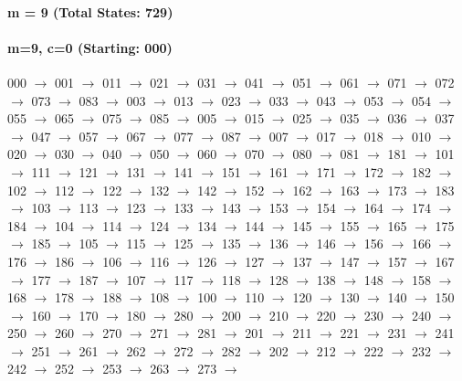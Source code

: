 \paragraph{ m = 9 (Total States: 729)}


\paragraph{m=9, c=0 (Starting: 000)}


000 $\rightarrow$ 001 $\rightarrow$ 011 $\rightarrow$ 021 $\rightarrow$ 031 $\rightarrow$ 041 $\rightarrow$ 051 $\rightarrow$ 061 $\rightarrow$ 071 $\rightarrow$ 072 $\rightarrow$ 073 $\rightarrow$ 083 $\rightarrow$ 003 $\rightarrow$ 013 $\rightarrow$ 023 $\rightarrow$ 033 $\rightarrow$ 043 $\rightarrow$ 053 $\rightarrow$ 054 $\rightarrow$ 055 $\rightarrow$ 065 $\rightarrow$ 075 $\rightarrow$ 085 $\rightarrow$ 005 $\rightarrow$ 015 $\rightarrow$ 025 $\rightarrow$ 035 $\rightarrow$ 036 $\rightarrow$ 037 $\rightarrow$ 047 $\rightarrow$ 057 $\rightarrow$ 067 $\rightarrow$ 077 $\rightarrow$ 087 $\rightarrow$ 007 $\rightarrow$ 017 $\rightarrow$ 018 $\rightarrow$ 010 $\rightarrow$ 020 $\rightarrow$ 030 $\rightarrow$ 040 $\rightarrow$ 050 $\rightarrow$ 060 $\rightarrow$ 070 $\rightarrow$ 080 $\rightarrow$ 081 $\rightarrow$ 181 $\rightarrow$ 101 $\rightarrow$ 111 $\rightarrow$ 121 $\rightarrow$ 131 $\rightarrow$ 141 $\rightarrow$ 151 $\rightarrow$ 161 $\rightarrow$ 171 $\rightarrow$ 172 $\rightarrow$ 182 $\rightarrow$ 102 $\rightarrow$ 112 $\rightarrow$ 122 $\rightarrow$ 132 $\rightarrow$ 142 $\rightarrow$ 152 $\rightarrow$ 162 $\rightarrow$ 163 $\rightarrow$ 173 $\rightarrow$ 183 $\rightarrow$ 103 $\rightarrow$ 113 $\rightarrow$ 123 $\rightarrow$ 133 $\rightarrow$ 143 $\rightarrow$ 153 $\rightarrow$ 154 $\rightarrow$ 164 $\rightarrow$ 174 $\rightarrow$ 184 $\rightarrow$ 104 $\rightarrow$ 114 $\rightarrow$ 124 $\rightarrow$ 134 $\rightarrow$ 144 $\rightarrow$ 145 $\rightarrow$ 155 $\rightarrow$ 165 $\rightarrow$ 175 $\rightarrow$ 185 $\rightarrow$ 105 $\rightarrow$ 115 $\rightarrow$ 125 $\rightarrow$ 135 $\rightarrow$ 136 $\rightarrow$ 146 $\rightarrow$ 156 $\rightarrow$ 166 $\rightarrow$ 176 $\rightarrow$ 186 $\rightarrow$ 106 $\rightarrow$ 116 $\rightarrow$ 126 $\rightarrow$ 127 $\rightarrow$ 137 $\rightarrow$ 147 $\rightarrow$ 157 $\rightarrow$ 167 $\rightarrow$ 177 $\rightarrow$ 187 $\rightarrow$ 107 $\rightarrow$ 117 $\rightarrow$ 118 $\rightarrow$ 128 $\rightarrow$ 138 $\rightarrow$ 148 $\rightarrow$ 158 $\rightarrow$ 168 $\rightarrow$ 178 $\rightarrow$ 188 $\rightarrow$ 108 $\rightarrow$ 100 $\rightarrow$ 110 $\rightarrow$ 120 $\rightarrow$ 130 $\rightarrow$ 140 $\rightarrow$ 150 $\rightarrow$ 160 $\rightarrow$ 170 $\rightarrow$ 180 $\rightarrow$ 280 $\rightarrow$ 200 $\rightarrow$ 210 $\rightarrow$ 220 $\rightarrow$ 230 $\rightarrow$ 240 $\rightarrow$ 250 $\rightarrow$ 260 $\rightarrow$ 270 $\rightarrow$ 271 $\rightarrow$ 281 $\rightarrow$ 201 $\rightarrow$ 211 $\rightarrow$ 221 $\rightarrow$ 231 $\rightarrow$ 241 $\rightarrow$ 251 $\rightarrow$ 261 $\rightarrow$ 262 $\rightarrow$ 272 $\rightarrow$ 282 $\rightarrow$ 202 $\rightarrow$ 212 $\rightarrow$ 222 $\rightarrow$ 232 $\rightarrow$ 242 $\rightarrow$ 252 $\rightarrow$ 253 $\rightarrow$ 263 $\rightarrow$ 273 $\rightarrow$ 